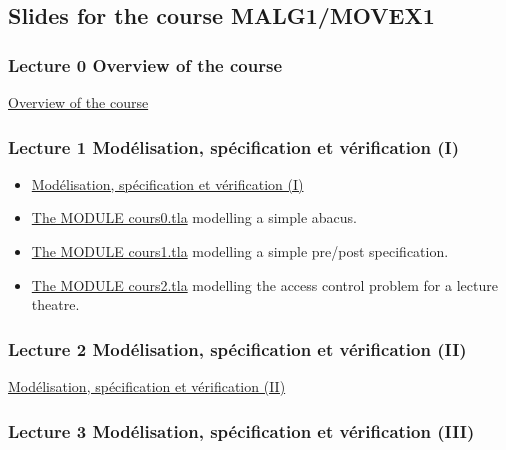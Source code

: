 \documentclass[ 12pt]{article}
\begin{document}
\subsection{Slides for the course MALG1/MOVEX1}
\label{sec:slides}


\subsubsection{Lecture 0 {Overview of the course }}
  
  \href{http://mery54.github.io/teaching/movex/lecturesnotes/movexlecture0.pdf}{Overview of the course }


\subsubsection{Lecture 1 {Mod\'elisation, 
    sp\'ecification et v\'erification}  (I) }
  
\begin{itemize}
\item
  \href{http://mery54.github.io/teaching/movex/lecturesnotes/movexlecture1.pdf}{Mod\'elisation, 
    sp\'ecification et v\'erification (I)}
\item   \href{http://mery54.github.io/teaching/movex/tlafolder/cours0.tla}{The 
    MODULE cours0.tla} modelling a  simple abacus.
  \item   \href{http://mery54.github.io/teaching/movex/tlafolder/cours0.tla}{The 
      MODULE cours1.tla} modelling a  simple pre/post specification.
  \item 
  \href{http://mery54.github.io/teaching/movex/tlafolder/access_control.tla}{The 
    MODULE cours2.tla} modelling the access control problem for a
  lecture theatre.  
 
\end{itemize}


  
\subsubsection{Lecture 2 {Mod\'elisation,      sp\'ecification et v\'erification} (II)}
  
  \href{http://mery54.github.io/teaching/movex/lecturesnotes/movexlecture2.pdf}{Mod\'elisation,     sp\'ecification et v\'erification (II)}


  \subsubsection{Lecture 3 {Mod\'elisation,      sp\'ecification et v\'erification} (III)}
  
\end{document}

